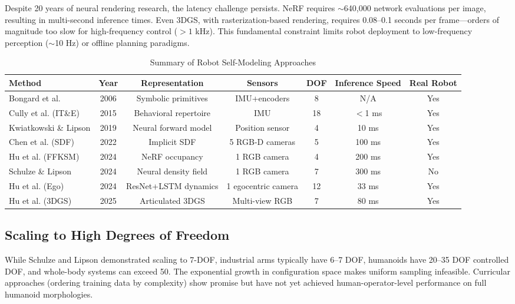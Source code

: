 \documentclass[journal]{IEEEtran}
\begin{document}
Despite 20 years of neural rendering research, the latency challenge persists. NeRF requires $\sim$640,000 network evaluations per image, resulting in multi-second inference times. Even 3DGS, with rasterization-based rendering, requires 0.08--0.1 seconds per frame---orders of magnitude too slow for high-frequency control ($> 1$ kHz). This fundamental constraint limits robot deployment to low-frequency perception ($\sim$10 Hz) or offline planning paradigms.

\begin{table}[!t]
\centering
\caption{Summary of Robot Self-Modeling Approaches}
\label{tab:self_model_comparison}
\begin{tabular}{@{\extracolsep{0pt}}lcccccc@{}}
\toprule
\textbf{Method} & \textbf{Year} & \textbf{Representation} & \textbf{Sensors} & \textbf{DOF} & \textbf{Inference Speed} & \textbf{Real Robot} \\
\midrule
Bongard et al. & 2006 & Symbolic primitives & IMU+encoders & 8 & N/A & Yes \\
Cully et al. (IT\&E) & 2015 & Behavioral repertoire & IMU & 18 & $<$1 ms & Yes \\
Kwiatkowski \& Lipson & 2019 & Neural forward model & Position sensor & 4 & 10 ms & Yes \\
Chen et al. (SDF) & 2022 & Implicit SDF & 5 RGB-D cameras & 5 & 100 ms & Yes \\
Hu et al. (FFKSM) & 2024 & NeRF occupancy & 1 RGB camera & 4 & 200 ms & Yes \\
Schulze \& Lipson & 2024 & Neural density field & 1 RGB camera & 7 & 300 ms & No \\
Hu et al. (Ego) & 2024 & ResNet+LSTM dynamics & 1 egocentric camera & 12 & 33 ms & Yes \\
Hu et al. (3DGS) & 2025 & Articulated 3DGS & Multi-view RGB & 7 & 80 ms & Yes \\
\bottomrule
\end{tabular}
\end{table}

\subsection{Scaling to High Degrees of Freedom}

While Schulze and Lipson demonstrated scaling to 7-DOF, industrial arms typically have 6--7 DOF, humanoids have 20--35 DOF controlled DOF, and whole-body systems can exceed 50. The exponential growth in configuration space makes uniform sampling infeasible. Curricular approaches (ordering training data by complexity) show promise but have not yet achieved human-operator-level performance on full humanoid morphologies.
\end{document}
